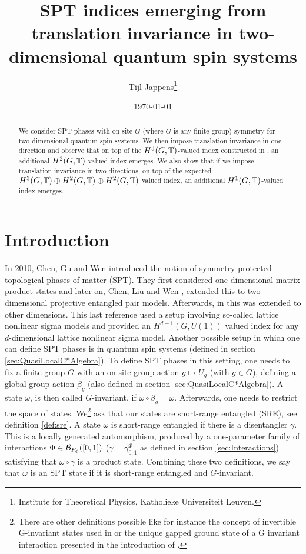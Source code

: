 \documentclass[11pt,a4paper,twoside]{article}
\title{SPT indices emerging from translation invariance in two-dimensional quantum spin systems}
\author{Tijl Jappens\footnote{Institute for Theoretical Physics, Katholieke Universiteit Leuven.}}
\date{\today}
\numberwithin{equation}{section}
\begin{document}
	\maketitle 
	\begin{abstract}
		We consider SPT-phases with on-site $G$ (where $G$ is any finite group) symmetry for two-dimensional quantum spin systems. We then impose translation invariance in one direction and observe that on top of the $H^3(G,\mathbb T)$-valued index constructed in \cite{ogata2021h3gmathbb}, an additional $H^2(G,\mathbb T)$-valued index emerges. We also show that if we impose translation invariance in two directions, on top of the expected $H^3(G,\mathbb T)\oplus H^2(G,\mathbb T)\oplus H^2(G,\mathbb T)$ valued index, an additional $H^1(G,\mathbb T)$-valued index emerges.
	\end{abstract}
	\section{Introduction}
	In 2010, Chen, Gu and Wen \cite{chen_gu_wen_2011} introduced the notion of symmetry-protected topological phases of matter (SPT). They first considered one-dimensional matrix product states and later on, Chen, Liu and Wen \cite{Chen_2011}, extended this to two-dimensional projective entangled pair models. Afterwards, in \cite{Chen_2013} this was extended to other dimensions. This last reference used a setup involving so-called lattice nonlinear sigma models and provided an $H^{d+1}(G,U(1))$ valued index for any $d$-dimensional lattice nonlinear sigma model. Another possible setup in which one can define SPT phases is in quantum spin systems (defined in section \ref{sec:QuasiLocalC*Algebra}). To define SPT phases in this setting, one needs to fix a finite group $G$ with an on-site group action $g\mapsto U_g$ (with $g\in G$), defining a global group action $\beta_g$ (also defined in section \ref{sec:QuasiLocalC*Algebra}). A state $\omega$, is then called $G$-invariant, if $\omega\circ\beta_g=\omega$. Afterwards, one needs to restrict the space of states. We\footnote{There are other definitions possible like for instance the concept of invertible G-invariant states used in \cite{kapustin2021classification} or the unique gapped ground state of a G invariant interaction presented in the introduction of \cite{ogata2021h3gmathbb}.} ask that our states are short-range entangled (SRE), see definition \ref{def:sre}. A state $\omega$ is short-range entangled if there is a disentangler $\gamma$. This is a locally generated automorphism, produced by a one-parameter family of interactions $\Phi\in\mathcal B_{F_\phi}([0,1])$ ($\gamma=\gamma_{0;1}^\Phi$ as defined in section \ref{sec:Interactions}) satisfying that $\omega\circ\gamma$ is a product state. Combining these two definitions, we say that $\omega$ is an SPT state if it is short-range entangled and $G$-invariant.
\end{document}
